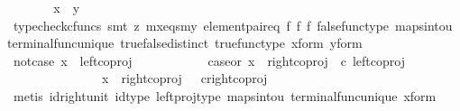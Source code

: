 \begin{isabellebody}
\ \ \ \ \isamarkupfalse%
\ \isamarkupfalse%
\ {\isachardoublequoteopen}x\ {\isacharequal}{\kern0pt}\ y{\isachardoublequoteclose}\isanewline
\ \ \ \ \ \ \isamarkupfalse%
\ {\isacharparenleft}{\kern0pt}typecheck{\isacharunderscore}{\kern0pt}cfuncs{\isacharcomma}{\kern0pt}\ smt\ {\isacharparenleft}{\kern0pt}z{}{\isacharparenright}{\kern0pt}\ mx{\isacharunderscore}{\kern0pt}eqs{\isacharunderscore}{\kern0pt}my\ element{\isacharunderscore}{\kern0pt}pair{\isacharunderscore}{\kern0pt}eq\ f{}\ f{}\ f{}\ false{\isacharunderscore}{\kern0pt}func{\isacharunderscore}{\kern0pt}type\ maps{\isacharunderscore}{\kern0pt}into{\isacharunderscore}{\kern0pt}{}u{}\ terminal{\isacharunderscore}{\kern0pt}func{\isacharunderscore}{\kern0pt}unique\ true{\isacharunderscore}{\kern0pt}false{\isacharunderscore}{\kern0pt}distinct\ true{\isacharunderscore}{\kern0pt}func{\isacharunderscore}{\kern0pt}type\ x{\isacharunderscore}{\kern0pt}form\ y{\isacharunderscore}{\kern0pt}form{\isacharparenright}{\kern0pt}\isanewline
\ \ \isamarkupfalse%
\isanewline
\ \ \ \ \isamarkupfalse%
\ not{\isacharunderscore}{\kern0pt}case{}{\isacharcolon}{\kern0pt}\ {\isachardoublequoteopen}x\ {\isasymnoteq}\ left{\isacharunderscore}{\kern0pt}coproj\ {\isasymone}\ {\isacharparenleft}{\kern0pt}{\isasymone}\ {\isasymCoprod}\ {\isasymone}{\isacharparenright}{\kern0pt}{\isachardoublequoteclose}\isanewline
\ \ \ \ \isamarkupfalse%
\ \isamarkupfalse%
\ case{}{\isacharunderscore}{\kern0pt}or{\isacharunderscore}{\kern0pt}{}{\isacharcolon}{\kern0pt}\ {\isachardoublequoteopen}x\ {\isacharequal}{\kern0pt}\ {\isacharparenleft}{\kern0pt}right{\isacharunderscore}{\kern0pt}coproj\ {\isasymone}\ {\isacharparenleft}{\kern0pt}{\isasymone}{\isasymCoprod}{\isasymone}{\isacharparenright}{\kern0pt}{\isasymcirc}\isactrlsub c\ left{\isacharunderscore}{\kern0pt}coproj\ {\isasymone}\ {\isasymone}{\isacharparenright}{\kern0pt}{\isasymor}\ \isanewline
\ \ \ \ \ \ \ \ \ \ \ \ \ \ \ x\ {\isacharequal}{\kern0pt}\ right{\isacharunderscore}{\kern0pt}coproj\ {\isasymone}\ {\isacharparenleft}{\kern0pt}{\isasymone}{\isasymCoprod}{\isasymone}{\isacharparenright}{\kern0pt}\ {\isasymcirc}\isactrlsub c{\isacharparenleft}{\kern0pt}right{\isacharunderscore}{\kern0pt}coproj\ {\isasymone}\ {\isasymone}{\isacharparenright}{\kern0pt}{\isachardoublequoteclose}\isanewline
\ \ \ \ \ \ \isamarkupfalse%
\ {\isacharparenleft}{\kern0pt}metis\ id{\isacharunderscore}{\kern0pt}right{\isacharunderscore}{\kern0pt}unit{}\ id{\isacharunderscore}{\kern0pt}type\ left{\isacharunderscore}{\kern0pt}proj{\isacharunderscore}{\kern0pt}type\ maps{\isacharunderscore}{\kern0pt}into{\isacharunderscore}{\kern0pt}{}u{}\ terminal{\isacharunderscore}{\kern0pt}func{\isacharunderscore}{\kern0pt}unique\ x{\isacharunderscore}{\kern0pt}form{\isacharparenright}{\kern0pt}\isanewline

\end{isabellebody}
